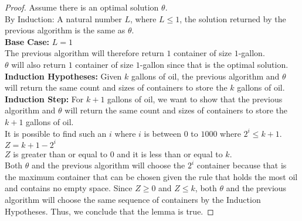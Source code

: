 \documentclass{article}
\theoremstyle{definition}
\theoremstyle{remark}
\theoremstyle{plain}
\begin{document}
\begin{proof}
Assume there is an optimal solution $\theta$. \\
By Induction: A natural number $L$, where $L \le 1$, the solution returned by the previous algorithm is the same as $\theta$.\\
\textbf{Base Case:}  $L = 1$\\
The previous algorithm will therefore return $1$ container of size $1$-gallon.\\
$\theta$ will also return $1$ container of size $1$-gallon since that is the optimal solution.\\
\textbf{Induction Hypotheses:} 
Given $k$ gallons of oil, the previous algorithm and $\theta$ will return the same count and sizes of containers to store the $k$ gallons of oil.\\
\textbf{Induction Step:} 
For $k+1$ gallons of oil, we want to show that the previous algorithm and $\theta$ will return the same count and sizes of containers to store the $k+1$ gallons of oil.\\
It is possible to find such an $i$ where $i$ is between $0$ to $1000$ where $2^i  \le k+1$.\\
$Z = k+1 - 2^i$\\
$Z$ is greater than or equal to $0$ and it is less than or equal to $k$.\\
Both $\theta$ and the previous algorithm will choose the $2^i$ container because that is the maximum container that can be chosen given the rule that holds the most oil and contains no empty space.
Since $Z \ge 0$ and $Z \le k$, both $\theta$ and the previous algorithm will choose the same sequence of containers by the Induction Hypotheses.
Thus, we conclude that the lemma is true.
\end{proof}
\end{document}
